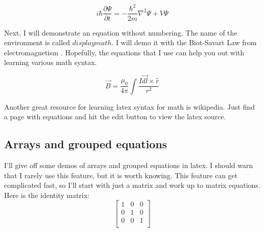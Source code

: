 \documentclass[11pt,letterpaper]{article}
\begin{document}
\begin{equation}
    i \hbar \frac{\partial \Psi}{\partial t} =
    -\frac{\hbar^2}{2m} \nabla^2 \Psi + V \Psi
    \label{quantum} %
\end{equation}

Next, I will demonstrate an equation without numbering. The name of the
environment is called $displaymath$. I will demo it with the Biot-Savart Law
from electromagnetism \cite{GriffithsEM:1999}. Hopefully, the equations that I
use can help you out with learning various math syntax.

\begin{displaymath}
    \vec{B} = \frac{\mu_0}{4\pi} \int \frac{I\vec{dl} \times \hat{r}}{r^2}
\end{displaymath}

Another great resource for learning latex syntax for math is wikipedia. Just
find a page with equations and hit the edit button to view the latex source.\\

\subsection{Arrays and grouped equations}

I'll give off some demos of arrays and grouped equations in latex. I should warn
that I rarely use this feature, but it is worth knowing. This feature can get
complicated fast, so I'll start with just a matrix and work up to matrix
equations.\\

Here is the identity matrix:
\begin{displaymath}
    \left[ %
    \begin{array}{ccc}
        1 & 0 & 0 \\
        0 & 1 & 0 \\
        0 & 0 & 1 \\
    \end{array}
    \right]
\end{displaymath}
\end{document}
